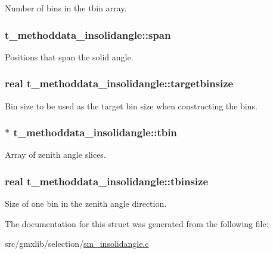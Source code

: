 \-Number of bins in the {\ttfamily tbin} array. \hypertarget{structt__methoddata__insolidangle_aad5ce88f1a977f3fee8c77be3928c727}{
\subsubsection[{span}]{ {\bf t\-\_\-methoddata\-\_\-insolidangle\-::span}}}\label{structt__methoddata__insolidangle_aad5ce88f1a977f3fee8c77be3928c727}
\-Positions that span the solid angle. \hypertarget{structt__methoddata__insolidangle_a83e7c021205702f30a5545f92c2f8519}{
\subsubsection[{targetbinsize}]{\setlength{\rightskip}{0pt plus 5cm}real {\bf t\-\_\-methoddata\-\_\-insolidangle\-::targetbinsize}}}\label{structt__methoddata__insolidangle_a83e7c021205702f30a5545f92c2f8519}
\-Bin size to be used as the target bin size when constructing the bins. \hypertarget{structt__methoddata__insolidangle_aad06b800f5a20a33266d048954ad61f1}{
\subsubsection[{tbin}]{$\ast$ {\bf t\-\_\-methoddata\-\_\-insolidangle\-::tbin}}}\label{structt__methoddata__insolidangle_aad06b800f5a20a33266d048954ad61f1}
\-Array of zenith angle slices. \hypertarget{structt__methoddata__insolidangle_aeac6f3e4dd5e3f04f8b4fbade5903d53}{
\subsubsection[{tbinsize}]{\setlength{\rightskip}{0pt plus 5cm}real {\bf t\-\_\-methoddata\-\_\-insolidangle\-::tbinsize}}}\label{structt__methoddata__insolidangle_aeac6f3e4dd5e3f04f8b4fbade5903d53}
\-Size of one bin in the zenith angle direction. 

\-The documentation for this struct was generated from the following file\-:\begin{DoxyCompactItemize}
\item 
src/gmxlib/selection/\hyperlink{sm__insolidangle_8c}{sm\-\_\-insolidangle.\-c}\end{DoxyCompactItemize}
